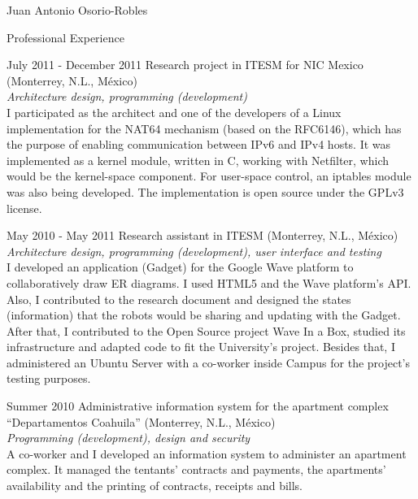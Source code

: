 \documentclass[spanish,10pt,letterpaper]{article}
\begin{document}
\begin{cv}{Juan Antonio Osorio-Robles}
	\begin{cvlist}{Professional Experience}
		\item [July 2011 - December 2011]
			Research project in ITESM for NIC Mexico (Monterrey, N.L., M\'{e}xico)
			\\ \emph{Architecture design, programming (development)}
			\\ I participated as the architect and one of the developers of a Linux implementation for the NAT64 mechanism (based on the RFC6146), which has the purpose of enabling communication between IPv6 and IPv4 hosts. It was implemented as a kernel module, written in C, working with Netfilter, which would be the kernel-space component. For user-space control, an iptables module was also being developed. The implementation is open source under the GPLv3 license.
		\item [May 2010 - May 2011]
			Research assistant in ITESM (Monterrey, N.L., M\'{e}xico)
			\\ \emph{Architecture design, programming (development), user interface and testing}
			\\ I developed an application (Gadget) for the Google Wave platform to collaboratively draw ER diagrams. I used HTML5 and the Wave platform's API. Also, I contributed to the research document and designed the states (information) that the robots would be sharing and updating with the Gadget. After that, I contributed to the Open Source project Wave In a Box, studied its infrastructure and adapted code to fit the University's project. Besides that, I administered an Ubuntu Server with a co-worker inside Campus for the project's testing purposes.
		\item [Summer 2010]
			Administrative information system for the apartment complex ``Departamentos Coahuila'' (Monterrey, N.L., M\'{e}xico)
			\\ \emph{Programming (development), design and security}
			\\ A co-worker and I developed an information system to administer an apartment complex. It managed the tentants' contracts and payments, the apartments' availability and the printing of contracts, receipts and bills.
			
	\end{cvlist}


\end{cv}
\end{document}
